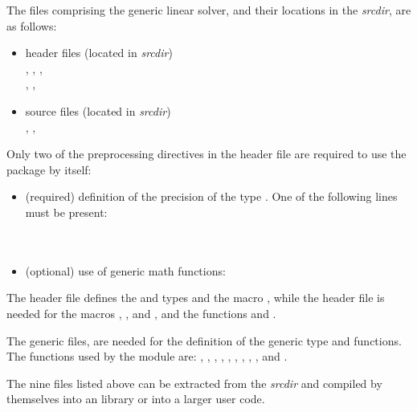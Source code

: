 The files comprising the {\spgmr} generic linear solver, and their locations
in the {\sundials} {\em srcdir}, are as follows:
\begin{itemize}
\item header files (located in {\em srcdir})\\
  , , , \\
  , ,  
\item source files (located in {\em srcdir})\\
  , , 
\end{itemize}
Only two of the preprocessing directives in the header file  
are required to use the {\spgmr} package by itself:
\begin{itemize}
\item (required) definition of the precision of the {\sundials} type . 
  One of the following lines must be present:\\
  \\
  \\
\item (optional) use of generic math functions:\\
\end{itemize}
The  header file defines the {\sundials}  and
 types and the macro , while the 
header file is needed for the macros , , and ,
and the functions  and .

The generic {\nvector} files,  are needed for the
definition of the generic  type and functions. 
The {\nvector} functions used by the {\spgmr} module are: 
, , , , , 
, , , , and
.

The nine files listed above can be extracted from the {\sundials} {\em srcdir} and
compiled by themselves into an {\spgmr} library or into a larger user code.
 
